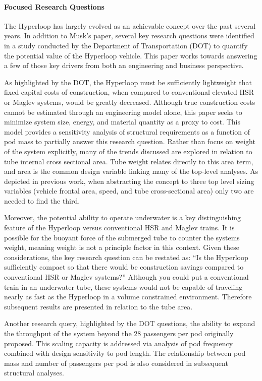 \paragraph{Focused Research Questions}

	The Hyperloop has largely evolved as an achievable concept over the past several years.
	In addition to Musk's paper, several key research questions were identified in a study conducted
	by the Department of Transportation (DOT) to quantify the potential value of the
	Hyperloop vehicle. \cite{Volpe} This paper works towards answering a few of
	those key drivers from both an engineering and business perspective.

	As highlighted by the DOT, the Hyperloop must be sufficiently lightweight
	that fixed capital costs of construction, when compared to conventional
	elevated HSR or Maglev systems, would be greatly decreased.
	Although true construction costs cannot be estimated through an engineering
	model alone, this paper seeks to minimize system size, energy, and material
	quantity as a proxy to cost. This model provides a sensitivity
	analysis of structural requirements as a function of pod mass to partially
	answer this research question. Rather than focus on weight of the system explicitly,
	many of the trends discussed are explored in relation to tube internal
	cross sectional area. Tube weight relates directly to this area term, and
	area is the common design variable linking many of the top-level
	analyses. As depicted in previous work,
	\cite{Chin} when abstracting the concept to three top level
	sizing variables (vehicle frontal area, speed, and tube cross-sectional area) only two are needed
	to find the third.

	Moreover, the potential ability to operate underwater is a key
	distinguishing feature of the Hyperloop versus conventional HSR and Maglev
	trains. It is possible for the buoyant force of the submerged tube to
	counter the systems weight, meaning weight is not a principle factor in
	this context. Given these considerations, the key research question can be
	restated as: ``Is the Hyperloop sufficiently compact so that there would
	be construction savings compared to conventional HSR or Maglev systems?''
	Although you could put a conventional train in an underwater tube, these
	systems would not be capable of traveling nearly as fast as the Hyperloop
	in a volume constrained environment. Therefore subsequent results are
	presented in relation to the tube area.

	Another research query, highlighted by the DOT questions, the ability to
	expand the throughput of the system beyond the 28 passengers per pod
	originally proposed. This scaling capacity is addressed
	via analysis of pod frequency combined with design sensitivity to pod length.
	The relationship between pod mass and number of passengers per pod is also
	considered in subsequent structural analyses.

